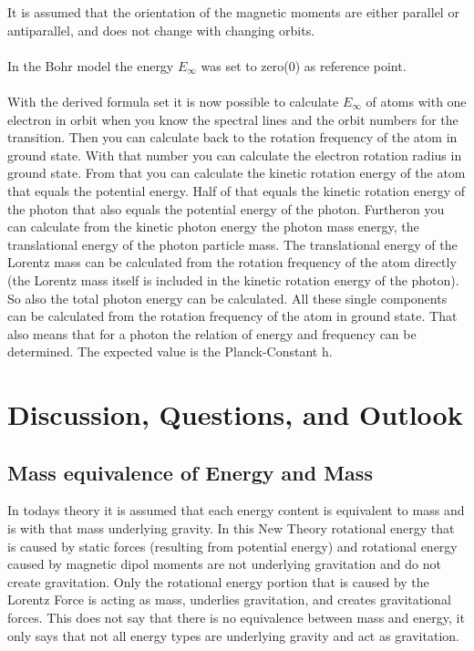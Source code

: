 \documentclass[10pt,titlepage]{article}
\begin{document}
It is assumed that the orientation of the magnetic moments are either parallel or antiparallel, and does not change with changing orbits.
\\\\
In the Bohr model the energy $E_{\infty}$ was set to zero(0) as reference point.
\\\\
With the derived formula set it is now possible to calculate $E_\infty $ of atoms with one electron in orbit when you know the spectral lines and the orbit numbers for the transition. Then you can calculate back to the rotation frequency of the atom in ground state. With that number you can calculate the electron rotation radius in ground state.  From that you can calculate the kinetic rotation energy of the atom that equals the potential energy. Half of that equals the kinetic rotation energy of the photon that also equals the potential energy of the photon. Furtheron you can calculate from the kinetic photon energy the photon mass energy, the translational energy of the photon particle mass. The translational energy of the Lorentz mass can be calculated from the rotation frequency of the atom directly (the Lorentz mass itself is included in the kinetic rotation energy of the photon). So also the total photon energy can be calculated. All these single components can be calculated from the rotation frequency of the atom in ground state.
That also means that for a photon the relation of energy and frequency can be determined. The expected value is the Planck-Constant h.

\section{Discussion, Questions, and Outlook}

\subsection{Mass equivalence of Energy and Mass}
In todays theory it is assumed that each energy content is equivalent to mass and is with that mass underlying gravity.
In this New Theory rotational energy that is caused by static forces (resulting from potential energy) and rotational energy caused by magnetic dipol moments are not underlying gravitation and do not create gravitation. Only the rotational energy portion that is caused by the Lorentz Force is acting as mass, underlies gravitation, and creates gravitational forces.
This does not say that there is no equivalence between mass and energy, it only says that not all energy types are underlying gravity and act as gravitation. \\
\end{document}
